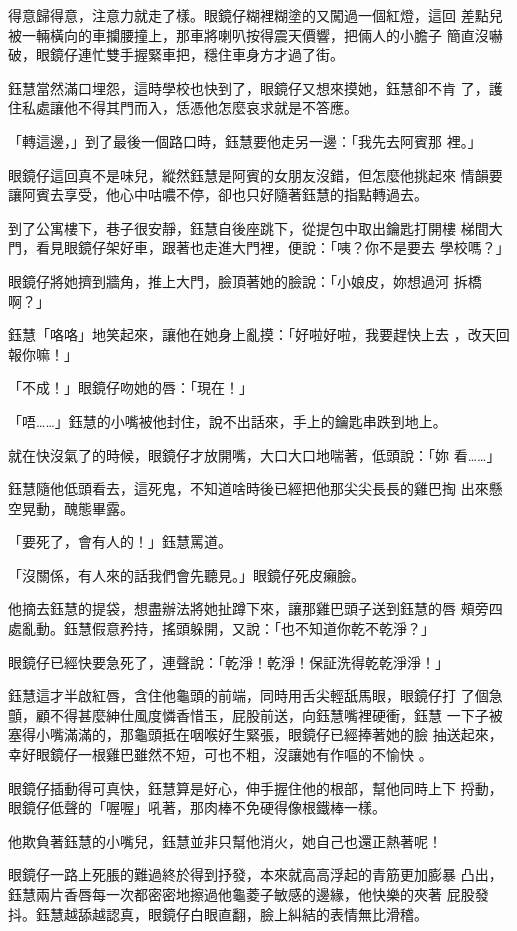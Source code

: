 得意歸得意，注意力就走了樣。眼鏡仔糊裡糊塗的又闖過一個紅燈，這回
差點兒被一輛橫向的車攔腰撞上，那車將喇叭按得震天價響，把倆人的小膽子
簡直沒嚇破，眼鏡仔連忙雙手握緊車把，穩住車身方才過了街。

鈺慧當然滿口埋怨，這時學校也快到了，眼鏡仔又想來摸她，鈺慧卻不肯
了，護住私處讓他不得其門而入，恁憑他怎麼哀求就是不答應。

「轉這邊，」到了最後一個路口時，鈺慧要他走另一邊：「我先去阿賓那
裡。」

眼鏡仔這回真不是味兒，縱然鈺慧是阿賓的女朋友沒錯，但怎麼他挑起來
情韻要讓阿賓去享受，他心中咕噥不停，卻也只好隨著鈺慧的指點轉過去。

到了公寓樓下，巷子很安靜，鈺慧自後座跳下，從提包中取出鑰匙打開樓
梯間大門，看見眼鏡仔架好車，跟著也走進大門裡，便說：「咦？你不是要去
學校嗎？」

眼鏡仔將她擠到牆角，推上大門，臉頂著她的臉說：「小娘皮，妳想過河
拆橋啊？」

鈺慧「咯咯」地笑起來，讓他在她身上亂摸：「好啦好啦，我要趕快上去
，改天回報你嘛！」

「不成！」眼鏡仔吻她的唇：「現在！」

「唔……」鈺慧的小嘴被他封住，說不出話來，手上的鑰匙串跌到地上。

就在快沒氣了的時候，眼鏡仔才放開嘴，大口大口地喘著，低頭說：「妳
看……」

鈺慧隨他低頭看去，這死鬼，不知道啥時後已經把他那尖尖長長的雞巴掏
出來懸空晃動，醜態畢露。

「要死了，會有人的！」鈺慧罵道。

「沒關係，有人來的話我們會先聽見。」眼鏡仔死皮癩臉。

他摘去鈺慧的提袋，想盡辦法將她扯蹲下來，讓那雞巴頭子送到鈺慧的唇
頰旁四處亂動。鈺慧假意矜持，搖頭躲開，又說：「也不知道你乾不乾淨？」

眼鏡仔已經快要急死了，連聲說：「乾淨！乾淨！保証洗得乾乾淨淨！」

鈺慧這才半啟紅唇，含住他龜頭的前端，同時用舌尖輕舐馬眼，眼鏡仔打
了個急顫，顧不得甚麼紳仕風度憐香惜玉，屁股前送，向鈺慧嘴裡硬衝，鈺慧
一下子被塞得小嘴滿滿的，那龜頭抵在咽喉好生緊張，眼鏡仔已經捧著她的臉
抽送起來，幸好眼鏡仔一根雞巴雖然不短，可也不粗，沒讓她有作嘔的不愉快
。

眼鏡仔插動得可真快，鈺慧算是好心，伸手握住他的根部，幫他同時上下
捋動，眼鏡仔低聲的「喔喔」吼著，那肉棒不免硬得像根鐵棒一樣。

他欺負著鈺慧的小嘴兒，鈺慧並非只幫他消火，她自己也還正熱著呢！

眼鏡仔一路上死脹的難過終於得到抒發，本來就高高浮起的青筋更加膨暴
凸出，鈺慧兩片香唇每一次都密密地擦過他龜菱子敏感的邊緣，他快樂的夾著
屁股發抖。鈺慧越舔越認真，眼鏡仔白眼直翻，臉上糾結的表情無比滑稽。

